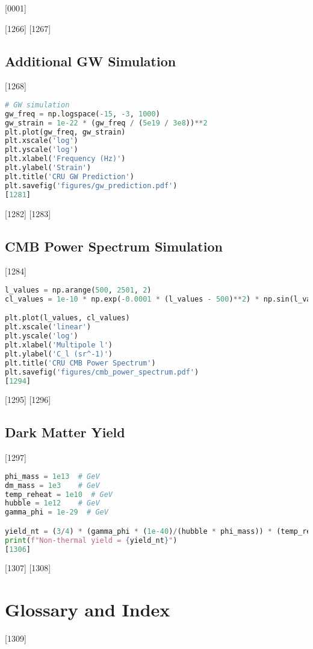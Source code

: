 [0001] \documentclass[12pt]{report}
[0002] \usepackage[utf8]{inputenc}
\begin{document}
[1266] 
[1267] \section{Additional GW Simulation}
[1268] \begin{lstlisting}[language=Python,caption={Gravitational wave strain simulation},label={lst:gw}]
# GW simulation
gw_freq = np.logspace(-15, -3, 1000)
gw_strain = 1e-22 * (gw_freq / (5e19 / 3e8))**2
plt.plot(gw_freq, gw_strain)
plt.xscale('log')
plt.yscale('log')
plt.xlabel('Frequency (Hz)')
plt.ylabel('Strain')
plt.title('CRU GW Prediction')
plt.savefig('figures/gw_prediction.pdf')
[1281] \end{lstlisting}
[1282] 
[1283] \section{CMB Power Spectrum Simulation}
[1284] \begin{lstlisting}[language=Python,caption={CMB power spectrum mockup},label={lst:cmb}]
l_values = np.arange(500, 2501, 2)
cl_values = 1e-10 * np.exp(-0.0001 * (l_values - 500)**2) * np.sin(l_values / 500)

plt.plot(l_values, cl_values)
plt.xscale('linear')
plt.yscale('log')
plt.xlabel('Multipole l')
plt.ylabel('C_l (sr^-1)')
plt.title('CRU CMB Power Spectrum')
plt.savefig('figures/cmb_power_spectrum.pdf')
[1294] \end{lstlisting}
[1295] 
[1296] \section{Dark Matter Yield}
[1297] \begin{lstlisting}[language=Python,caption={Non-thermal DM yield},label={lst:dm}]
phi_mass = 1e13  # GeV
dm_mass = 1e3    # GeV
temp_reheat = 1e10  # GeV
hubble = 1e12    # GeV
gamma_phi = 1e-29  # GeV

yield_nt = (3/4) * (gamma_phi * (1e-40)/(hubble * phi_mass)) * (temp_reheat/dm_mass)
print(f"Non-thermal yield = {yield_nt}")
[1306] \end{lstlisting}
[1307] 
[1308] \chapter{Glossary and Index}
[1309] \printindex
\end{document}
